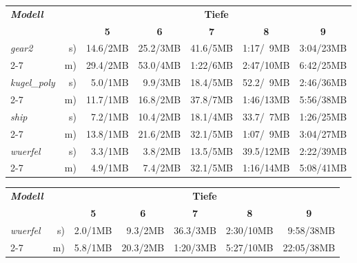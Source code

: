 \tabbeg[!t]
\newcommand*\myhline{\hline\hline}
\newcommand*\myitema[6]{\emph{#1} & s) & #2 & #3 & #4 & #5 & #6 \\\cline{2-7}}
\newcommand*\myitemb[5]{          & m) & #1 & #2 & #3 & #4 & #5 \\}
\begin{tabular}{|lr|r|r|r|r|r|}
\hline
\textbf{\emph{Modell}} & & \multicolumn{5}{c|}{\textbf{Tiefe}} \\
  & & \multicolumn{1}{c|}{\textbf{5}} & \multicolumn{1}{c|}{\textbf{6}}
    & \multicolumn{1}{c|}{\textbf{7}} & \multicolumn{1}{c|}{\textbf{8}} 
    & \multicolumn{1}{c|}{\textbf{9}} \\
\hline \hline
\myitema{gear2}{      14.6/2MB}{25.2/3MB}{41.6/5MB}{1:17/~9MB}{3:04/23MB}
\myitemb{             29.4/2MB}{53.0/4MB}{1:22/6MB}{2:47/10MB}{6:42/25MB}
\myhline
\myitema{kugel\_poly}{~5.0/1MB}{~9.9/3MB}{18.4/5MB}{52.2/~9MB}{2:46/36MB}
\myitemb{             11.7/1MB}{16.8/2MB}{37.8/7MB}{1:46/13MB}{5:56/38MB}
\myhline
\myitema{ship}{       ~7.2/1MB}{10.4/2MB}{18.1/4MB}{33.7/~7MB}{1:26/25MB}
\myitemb{             13.8/1MB}{21.6/2MB}{32.1/5MB}{1:07/~9MB}{3:04/27MB}
\myhline
\myitema{wuerfel}{    ~3.3/1MB}{~3.8/2MB}{13.5/5MB}{39.5/12MB}{2:22/39MB}
\myitemb{             ~4.9/1MB}{~7.4/2MB}{32.1/5MB}{1:16/14MB}{5:08/41MB}
\hline
\end{tabular}

\tabbeg[!t]
\newcommand*\myitema[6]{\emph{#1} & s) & #2 & #3 & #4 & #5 & #6 \\\cline{2-7}}
\newcommand*\myitemb[5]{          & m) & #1 & #2 & #3 & #4 & #5 \\}
\begin{tabular}{|lr|r|r|r|r|r|}
\hline
\textbf{\emph{Modell}} & & \multicolumn{5}{c|}{\textbf{Tiefe}} \\
  & & \multicolumn{1}{c|}{\textbf{5}} & \multicolumn{1}{c|}{\textbf{6}}
    & \multicolumn{1}{c|}{\textbf{7}} & \multicolumn{1}{c|}{\textbf{8}} 
    & \multicolumn{1}{c|}{\textbf{9}} \\
\hline
\myitema{wuerfel}{2.0/1MB}{~9.3/2MB}{36.3/3MB}{2:30/10MB}{~9:58/38MB}
\myitemb{         5.8/1MB}{20.3/2MB}{1:20/3MB}{5:27/10MB}{22:05/38MB}
\hline
\end{tabular}

